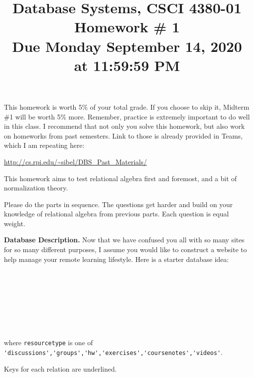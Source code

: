 \documentclass[11pt]{article}
\title{Database Systems, CSCI 4380-01 \\
Homework \# 1 \\
Due Monday September 14, 2020 at 11:59:59 PM}
\date{}
\begin{document}
\maketitle

\vspace*{-0.7in}

 This homework is worth 5\% of your
total grade. If you choose to skip it, Midterm \#1 will be worth 5\%
more. Remember, practice is extremely important to do well in this
class. I recommend that not only you solve this homework, but also
work on homeworks from past semesters. Link to those is already
provided in Teams, which I am repeating here:

\url{http://cs.rpi.edu/~sibel/DBS_Past_Materials/}

This homework aims to test relational algebra first and foremost, and
a bit of normalization theory.

Please do the parts in sequence. The questions get
harder and build on your knowledge of relational algebra from previous
parts. Each question is equal weight.

{\bf Database Description.} Now that we have confused you all with so
many sites for so many different purposes, I assume you would like to
construct a website to help manage your remote learning
lifestyle. Here is a starter database idea:

\\
\\
\\
\\
\\
\\
\\

where {\tt resourcetype} is one of \verb+'discussions','groups','hw','exercises','coursenotes','videos'+.

Keys for each relation are underlined.
\end{document}
